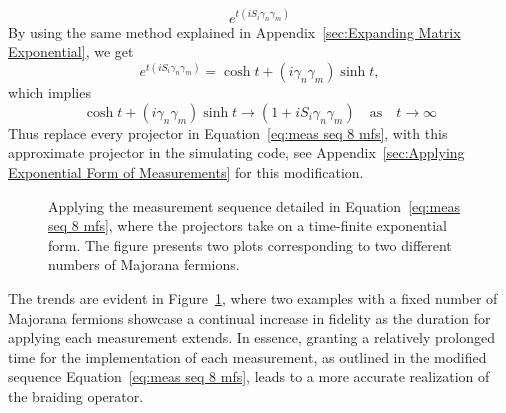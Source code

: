 \documentclass{article}
\begin{document}
\[
	e^{t ( iS_i \gamma_n \gamma_m )}
\]
By using the same method explained in Appendix~\ref{sec:Expanding Matrix Exponential}, we get
\[
	e^{t ( iS_i \gamma_n \gamma_m )} = \cosh{t} + (i \gamma_n \gamma_m) \sinh{t},
\]
which implies
\[
	\cosh{t} + (i \gamma_n \gamma_m) \sinh{t} \rightarrow (1 + i S_i \gamma_n \gamma_m)
	\quad \text{as} \quad t \rightarrow \infty
\]
Thus replace every projector in Equation~\ref{eq:meas seq 8 mfs}, with this approximate projector in the simulating code, see Appendix~\ref{sec:Applying Exponential Form of Measurements} for this modification.
\begin{figure}
	\begin{center}
		
	\end{center}
	\caption{Applying the measurement sequence detailed in Equation~\ref{eq:meas seq 8 mfs}, where the projectors take on a time-finite exponential form. The figure presents two plots corresponding to two different numbers of Majorana fermions.}
	\label{fig:fid with approx proj}
\end{figure}
The trends are evident in Figure~\ref{fig:fid with approx proj}, where two examples with a fixed number of Majorana fermions showcase a continual increase in fidelity as the duration for applying each measurement extends. In essence, granting a relatively prolonged time for the implementation of each measurement, as outlined in the modified sequence Equation~\ref{eq:meas seq 8 mfs}, leads to a more accurate realization of the braiding operator.
\end{document}
